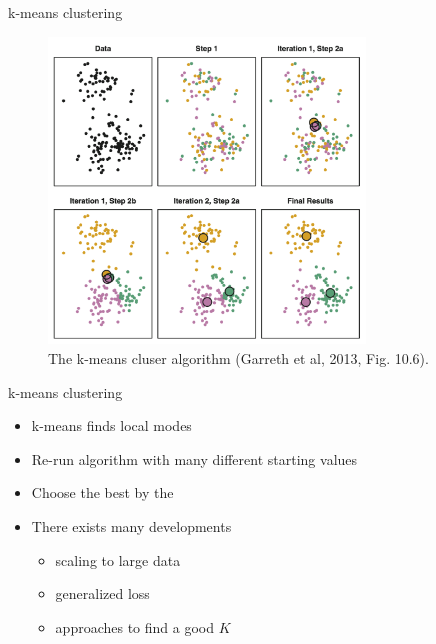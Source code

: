 \documentclass[10pt]{beamer}
\begin{document}
\begin{frame}{k-means clustering}

\begin{figure}[h]
\centering
\includegraphics[width=0.75\textwidth]{fig/fig_10_6_kmeans_algo.png}
\caption{The k-means cluser algorithm (Garreth et al, 2013, Fig. 10.6).}
\end{figure}

\end{frame}


\begin{frame}{k-means clustering}

\begin{itemize}
\item k-means finds {\color{uured} local modes}
\item Re-run algorithm with many {\color{uured} different starting values}
\item Choose the best by the 
\pause
\item There exists many developments
\begin{itemize}
\item scaling to large data
\pause
\item generalized loss
\pause
\item approaches to find a good $K$
\end{itemize}
\end{itemize}
\end{frame}
\end{document}
